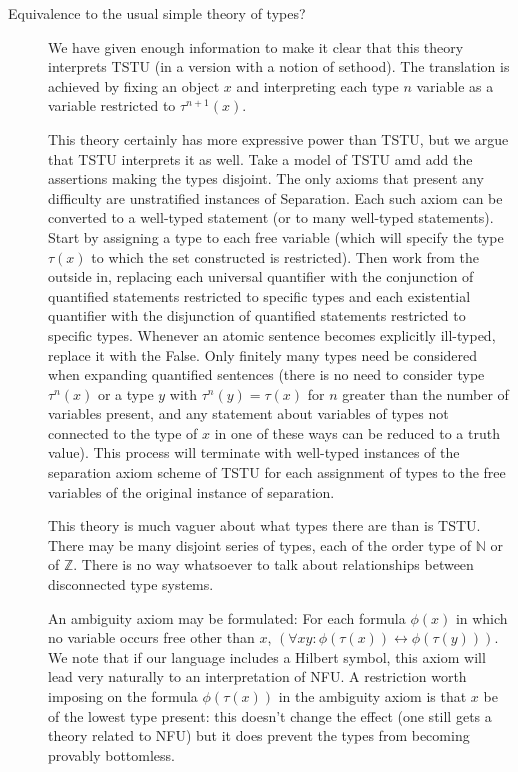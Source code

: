 \documentclass[12pt]{article}
\begin{document}
\begin{description}
\item[Equivalence to the usual simple theory of types?]  We have given enough information to make it clear that this theory interprets TSTU (in a version with a notion of sethood).  The translation is achieved by fixing
an object $x$ and interpreting each type $n$ variable as a variable restricted to $\tau^{n+1}(x)$.

This theory certainly has more expressive power than TSTU, but we argue that TSTU interprets it as well.  Take a model of TSTU amd add the assertions making the types disjoint.
The only axioms that present any difficulty are unstratified instances of Separation.  Each such axiom can be converted to a well-typed statement (or to many well-typed statements).
Start by assigning a type to each free variable (which will specify the type $\tau(x)$ to which the set constructed is restricted).  Then work from the outside in, replacing each universal quantifier
with the conjunction of quantified statements restricted to specific types and each existential quantifier with the disjunction of quantified statements restricted to specific types.
Whenever an atomic sentence becomes explicitly ill-typed, replace it with the False.  Only finitely many types need be considered when expanding quantified sentences (there is no need to consider type
$\tau^n(x)$ or a type $y$ with $\tau^n(y) = \tau(x)$ for $n$ greater than the number of variables present, and any statement about variables of types not connected to the type
of $x$ in one of these ways can be reduced to a truth value).  This process will terminate with well-typed instances of the separation axiom scheme of TSTU for each assignment
of types to the free variables of the original instance of separation.

This theory is much vaguer about what types there are than is TSTU.  There may be many disjoint series of types, each of the order type of $\mathbb N$  or of $\mathbb Z$.  There is no way whatsoever to talk about relationships between disconnected type systems.

An ambiguity axiom may be formulated:  For each formula $\phi(x)$ in which no variable occurs free other than $x$, $(\forall xy:\phi(\tau(x)) \leftrightarrow \phi(\tau(y)))$.  We note that if our language includes a Hilbert symbol, this axiom will lead very naturally to an interpretation of NFU.  A restriction worth imposing on the formula $\phi(\tau(x))$ in the ambiguity axiom is that
$x$ be of the lowest type present:  this doesn't change the effect (one still gets a theory related to NFU) but it does prevent the types from becoming provably bottomless.

\end{description}
\end{document}
